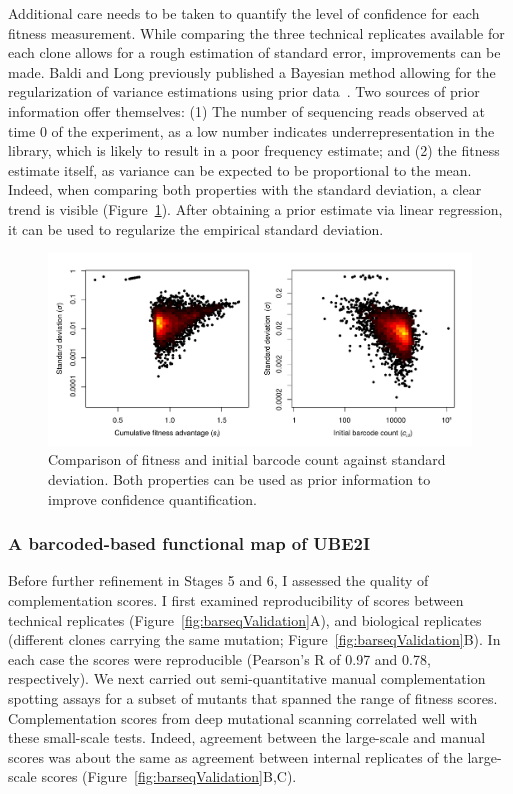 Additional care needs to be taken to quantify the level of confidence for each fitness measurement. While comparing the three technical replicates available for each clone allows for a rough estimation of standard error, improvements can be made. Baldi and Long previously published a Bayesian method allowing for the regularization of variance estimations using prior data~\cite{baldi_bayesian_2001}. Two sources of prior information offer themselves: (1) The number of sequencing reads observed at time 0 of the experiment, as a low number indicates underrepresentation in the library, which is likely to result in a poor frequency estimate; and (2) the fitness estimate itself, as variance can be expected to be proportional to the mean. Indeed, when comparing both properties with the standard deviation, a clear trend is visible (Figure~\ref{fig:baldiLong}). After obtaining a prior estimate via linear regression, it can be used to regularize the empirical standard deviation.

\begin{figure}[h!]
	\centering
	\includegraphics[width=\textwidth]{img/baldi_long.pdf}
	\caption{Comparison of fitness and initial barcode count against standard deviation. Both properties can be used as prior information to improve confidence quantification.}
	\label{fig:baldiLong}
\end{figure}


\subsubsection{A barcoded-based functional map of UBE2I}

Before further refinement in Stages 5 and 6, I assessed the quality of complementation scores. I first examined reproducibility of scores between technical replicates (Figure~\ref{fig:barseqValidation}A), and biological replicates (different clones carrying the same mutation; Figure~\ref{fig:barseqValidation}B).  In each case the scores were reproducible (Pearson's R of 0.97 and 0.78, respectively). We next carried out semi-quantitative manual complementation spotting assays for a subset of mutants that spanned the range of fitness scores. Complementation scores from deep mutational scanning correlated well with these small-scale tests. Indeed, agreement between the large-scale and manual scores was about the same as agreement between internal replicates of the large-scale scores (Figure~\ref{fig:barseqValidation}B,C). 

